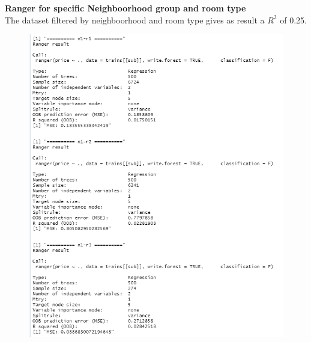 \documentclass{FR16}
\begin{document}
\noindent
\textbf{Ranger for specific Neighboorhood group and room type}\\
The dataset filtered by neighboorhood and room type gives as result a $R^2$ of 0.25.
\begin{figure}[!htb]
   \begin{minipage}{0.33\textwidth}
     \centering
     \includegraphics[width=1\linewidth]{figures/rgn2.1.png} 
   \end{minipage}\hfill
   \begin{minipage}{0.33\textwidth}
     \centering

\end{minipage}
\end{figure}
\end{document}
